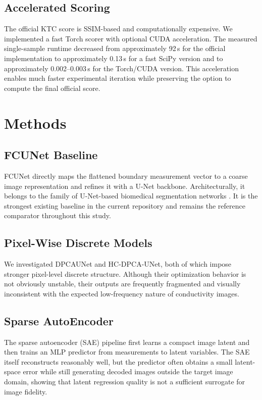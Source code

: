 \documentclass[11pt,a4paper]{article}
\begin{document}
\subsection{Accelerated Scoring}
The official KTC score is SSIM-based and computationally expensive. We implemented a fast Torch scorer with optional CUDA acceleration. The measured single-sample runtime decreased from approximately 92\,s for the official implementation to approximately 0.13\,s for a fast SciPy version and to approximately 0.002--0.003\,s for the Torch/CUDA version. This acceleration enables much faster experimental iteration while preserving the option to compute the final official score.

\section{Methods}
\subsection{FCUNet Baseline}
FCUNet directly maps the flattened boundary measurement vector to a coarse image representation and refines it with a U-Net backbone. Architecturally, it belongs to the family of U-Net-based biomedical segmentation networks \cite{ronneberger2015unet}. It is the strongest existing baseline in the current repository and remains the reference comparator throughout this study.

\subsection{Pixel-Wise Discrete Models}
We investigated DPCAUNet and HC-DPCA-UNet, both of which impose stronger pixel-level discrete structure. Although their optimization behavior is not obviously unstable, their outputs are frequently fragmented and visually inconsistent with the expected low-frequency nature of conductivity images.

\subsection{Sparse AutoEncoder}
The sparse autoencoder (SAE) pipeline first learns a compact image latent and then trains an MLP predictor from measurements to latent variables. The SAE itself reconstructs reasonably well, but the predictor often obtains a small latent-space error while still generating decoded images outside the target image domain, showing that latent regression quality is not a sufficient surrogate for image fidelity.
\end{document}
